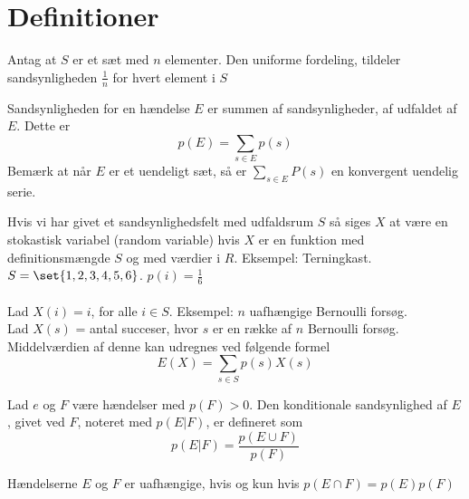 \section{Definitioner}

\begin{frdef}[S. 440, 1]
Antag at $S$ er et sæt med $n$ elementer. Den uniforme fordeling, tildeler sandsynligheden $\frac{1}{n}$ for hvert element i $S$
\end{frdef}

\begin{frdef}[S. 440, 2]
Sandsynligheden for en hændelse $E$ er summen af sandsynligheder, af udfaldet af $E$. Dette er 
\begin{equation}
p(E)=\sum_{s\in E} p(s)
\end{equation}
Bemærk at når $E$ er et uendeligt sæt, så er $\sum_{s\in E} P(s)$ en konvergent uendelig serie.
\end{frdef}

\begin{frdef}[SLIAL02, S. 9]
Hvis vi har givet et sandsynlighedsfelt med udfaldsrum $S$ så siges
$X$ at være en stokastisk variabel (random variable) hvis $X$ er
en funktion med definitionsmængde $S$ og med værdier i $R$.
Eksempel: Terningkast. $S = \set{1, 2, 3, 4, 5, 6}$.
$p(i) = \frac{1}{6}$
\\\\
Lad $X(i) = i$, for alle $i \in S$. Eksempel: $n$ uafhængige Bernoulli forsøg.\\
Lad $X(s)$ = antal succeser, hvor $s$ er en række af $n$ Bernoulli
forsøg.
\\Middelværdien af denne kan udregnes ved følgende formel
\begin{equation}
E(X)=\sum_{s\in S} p(s)X(s)
\end{equation}
\end{frdef}

\begin{frdef}[S. 442, 3]
Lad $e$ og $F$ være hændelser med $p(F)>0$. Den konditionale sandsynlighed af $E$, givet ved $F$, noteret med $p(E|F)$, er defineret som
\begin{equation}
p(E|F)=\frac{p(E\cup F)}{p(F)}
\end{equation}
\end{frdef}

\begin{frdef}[S. 443, 4]
Hændelserne $E$ og $F$ er uafhængige, hvis og kun hvis $p(E\cap F)=p(E)p(F)$
\end{frdef}

